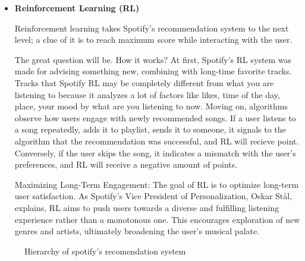 \documentclass[12pt,a4paper]{article}
\begin{document}
\begin{itemize}
 \item \textbf{Reinforcement Learning (RL)}

 Reinforcement learning takes Spotify’s recommendation system to the next level; a clue of it is to reach maximum score while interacting with the user.

The great question will be. How it works? At first, Spotify's RL system was made for advising something new, combining with long-time favorite tracks. Tracks that Spotify RL may be completely different from what you are listening to because it analyzes a lot of factors like likes, time of the day, place, your mood by what are you listening to now. Moving on, algorithms observe how users engage with newly recommended songs. If a user listens to a song repeatedly, adds it to playlist, sends it to someone, it signals to the algorithm that the recommendation was successful, and RL will recieve point. Conversely, if the user skips the song, it indicates a mismatch with the user's preferences, and RL will receive a negative amount of points.\citep{Z}

Maximizing Long-Term Engagement: The goal of RL is to optimize long-term user satisfaction. As Spotify's Vice President of Personalization, Oskar Stål, explains, RL aims to push users towards a diverse and fulfilling listening experience rather than a monotonous one. This encourages exploration of new genres and artists, ultimately broadening the user's musical palate\citep{spotifys}.

\end{itemize}

\begin{figure}
\begin{center}
\end{center}
\caption{Hierarchy of spotify's recomendation system}
\label{Schema 2}
\end{figure}
\end{document}

